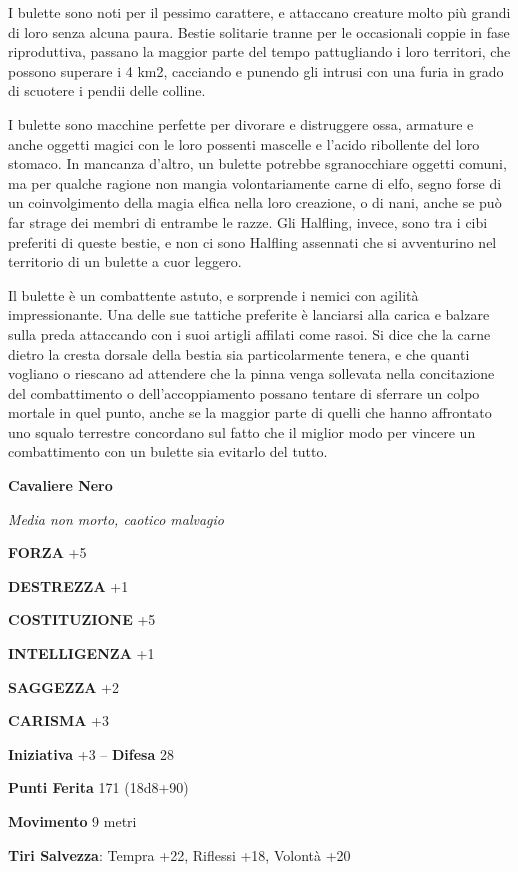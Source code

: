 \begin{multicols}{2}
I bulette sono noti per il pessimo carattere, e attaccano creature molto più grandi di loro senza alcuna paura. Bestie solitarie tranne per le occasionali coppie in fase riproduttiva, passano la maggior parte del tempo pattugliando i loro territori, che possono superare i 4 km2, cacciando e punendo gli intrusi con una furia in grado di scuotere i pendii delle colline.

I bulette sono macchine perfette per divorare e distruggere ossa, armature e anche oggetti magici con le loro possenti mascelle e l'acido ribollente del loro stomaco. In mancanza d'altro, un bulette potrebbe sgranocchiare oggetti comuni, ma per qualche ragione non mangia volontariamente carne di elfo, segno forse di un coinvolgimento della magia elfica nella loro creazione, o di nani, anche se può far strage dei membri di entrambe le razze. Gli Halfling, invece, sono tra i cibi preferiti di queste bestie, e non ci sono Halfling assennati che si avventurino nel territorio di un bulette a cuor leggero.

Il bulette è un combattente astuto, e sorprende i nemici con agilità impressionante. Una delle sue tattiche preferite è lanciarsi alla carica e balzare sulla preda attaccando con i suoi artigli affilati come rasoi. Si dice che la carne dietro la cresta dorsale della bestia sia particolarmente tenera, e che quanti vogliano o riescano ad attendere che la pinna venga sollevata nella concitazione del combattimento o dell'accoppiamento possano tentare di sferrare un colpo mortale in quel punto, anche se la maggior parte di quelli che hanno affrontato uno squalo terrestre concordano sul fatto che il miglior modo per vincere un combattimento con un bulette sia evitarlo del tutto.

\medskip{}\textbf{Cavaliere Nero}

\textit{Media non morto, caotico malvagio}

\textbf{FORZA} +5

\textbf{DESTREZZA} +1

\textbf{COSTITUZIONE} +5

\textbf{INTELLIGENZA} +1

\textbf{SAGGEZZA} +2

\textbf{CARISMA} +3

\textbf{Iniziativa} +3 -- \textbf{Difesa} 28

\textbf{Punti Ferita} 171 (18d8+90)

\textbf{Movimento} 9 metri

\textbf{Tiri Salvezza}: Tempra +22, Riflessi +18, Volontà +20


\end{multicols}
